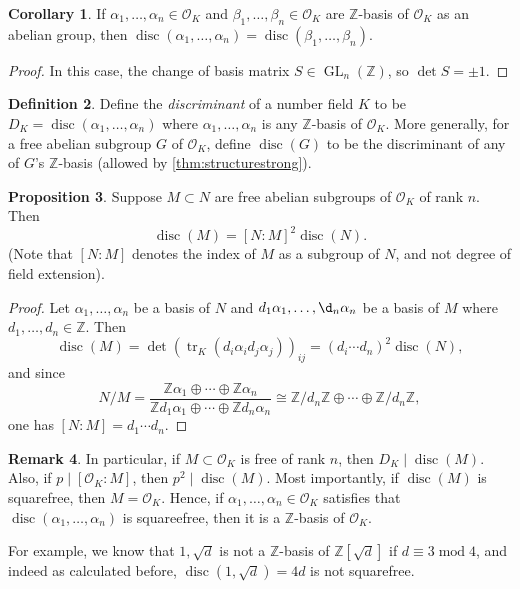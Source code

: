 \documentclass{article}
\newcommand{\Z}{\mathbb{Z}}
\newcommand{\tr}{\operatorname{tr}}
\newcommand{\Mod}{\operatorname{mod}}
\newcommand{\GL}{\operatorname{GL}}
\newcommand{\disc}{\operatorname{disc}}
\newcommand{\ri}{\mathcal{O}}
\theoremstyle{definition}
\newtheorem{defn}{Definition}[subsection]
\newtheorem{prop}[defn]{Proposition}
\newtheorem{coro}[defn]{Corollary}
\newtheorem{remark}[defn]{Remark}
\begin{document}
\begin{coro}
\label{coro:diffbassamedisc}
If $\alpha_1,\ldots,\alpha_n\in\ri_K$ and $\beta_1,\ldots,\beta_n\in\ri_K$ are $\Z$-basis of $\ri_K$ as an abelian group, then $\disc(\alpha_1,\ldots,\alpha_n)=\disc(\beta_1,\ldots,\beta_n)$.
\end{coro}
\begin{proof}
In this case, the change of basis matrix $S\in\GL_n(\Z)$, so $\det S=\pm 1$.
\end{proof}

\begin{defn}
Define the \textit{discriminant} of a number field $K$ to be $D_K=\disc(\alpha_1,\ldots,\alpha_n)$ where $\alpha_1,\ldots,\alpha_n$ is any $\Z$-basis of $\ri_K$. More generally, for a free abelian subgroup $G$ of $\ri_K$, define $\disc(G)$ to be the discriminant of any of $G$'s $\Z$-basis (allowed by \ref{thm:structurestrong}).
\end{defn}

\begin{prop}
\label{prop:discratioofsbgrp}
Suppose $M\subset N$ are free abelian subgroups of $\ri_K$ of rank $n$. Then
\[
\disc(M)=[N:M]^2\disc(N).
\]
(Note that $[N:M]$ denotes the index of $M$ as a subgroup of $N$, and not degree of field extension).
\end{prop}
\begin{proof}
Let $\alpha_1,\ldots,\alpha_n$ be a basis of $N$ and $d_1\alpha_1,\ldots,\d_n\alpha_n$ be a basis of $M$ where $d_1,\ldots,d_n\in\Z$. Then
\[
\disc(M)=\det (\tr_K(d_i\alpha_i d_j\alpha_j))_{ij}=(d_i\cdots d_n)^2\disc (N),
\]
and since
\[
N/M=\frac{\Z\alpha_1\oplus\cdots\oplus\Z\alpha_n}{\Z d_1\alpha_1\oplus\cdots\oplus\Z d_n\alpha_n}\cong \Z/d_n\Z\oplus\cdots\oplus\Z/d_n\Z,
\]
one has $[N:M]=d_1\cdots d_n$.
\end{proof}

\begin{remark}
In particular, if $M\subset\ri_K$ is free of rank $n$, then $D_K\mid\disc(M)$. Also, if $p\mid [\ri_K:M]$, then $p^2\mid\disc(M)$. Most importantly, if $\disc(M)$ is squarefree, then $M=\ri_K$. Hence, if $\alpha_1,\ldots,\alpha_n\in\ri_K$ satisfies that $\disc(\alpha_1,\ldots,\alpha_n)$ is squareefree, then it is a $\Z$-basis of $\ri_K$.

For example, we know that $1,\sqrt d$ is not a $\Z$-basis of $\Z\left[\sqrt d\right]$ if $d\equiv 3\Mod 4$, and indeed as calculated before, $\disc\left(1,\sqrt d\right)=4d$ is not squarefree.
\end{remark}
\end{document}
